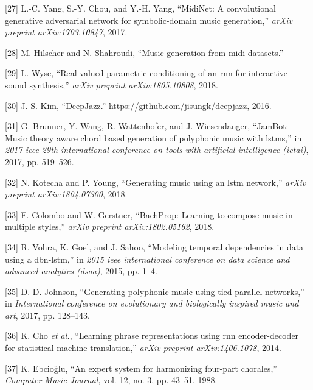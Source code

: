 \documentclass[12pt,]{article}
\begin{document}
\leavevmode\hypertarget{ref-yang2017midinet}{}%
{[}27{]} L.-C. Yang, S.-Y. Chou, and Y.-H. Yang, ``MidiNet: A
convolutional generative adversarial network for symbolic-domain music
generation,'' \emph{arXiv preprint arXiv:1703.10847}, 2017.

\leavevmode\hypertarget{ref-hilschermusic}{}%
{[}28{]} M. Hilscher and N. Shahroudi, ``Music generation from midi
datasets.''

\leavevmode\hypertarget{ref-wyse2018real}{}%
{[}29{]} L. Wyse, ``Real-valued parametric conditioning of an rnn for
interactive sound synthesis,'' \emph{arXiv preprint arXiv:1805.10808},
2018.

\leavevmode\hypertarget{ref-kim2016deepjazz}{}%
{[}30{]} J.-S. Kim, ``DeepJazz.''
\url{https://github.com/jisungk/deepjazz}, 2016.

\leavevmode\hypertarget{ref-brunner2017jambot}{}%
{[}31{]} G. Brunner, Y. Wang, R. Wattenhofer, and J. Wiesendanger,
``JamBot: Music theory aware chord based generation of polyphonic music
with lstms,'' in \emph{2017 ieee 29th international conference on tools
with artificial intelligence (ictai)}, 2017, pp. 519--526.

\leavevmode\hypertarget{ref-kotecha2018generating}{}%
{[}32{]} N. Kotecha and P. Young, ``Generating music using an lstm
network,'' \emph{arXiv preprint arXiv:1804.07300}, 2018.

\leavevmode\hypertarget{ref-colombo2018bachprop}{}%
{[}33{]} F. Colombo and W. Gerstner, ``BachProp: Learning to compose
music in multiple styles,'' \emph{arXiv preprint arXiv:1802.05162},
2018.

\leavevmode\hypertarget{ref-vohra2015modeling}{}%
{[}34{]} R. Vohra, K. Goel, and J. Sahoo, ``Modeling temporal
dependencies in data using a dbn-lstm,'' in \emph{2015 ieee
international conference on data science and advanced analytics (dsaa)},
2015, pp. 1--4.

\leavevmode\hypertarget{ref-johnson2017generating}{}%
{[}35{]} D. D. Johnson, ``Generating polyphonic music using tied
parallel networks,'' in \emph{International conference on evolutionary
and biologically inspired music and art}, 2017, pp. 128--143.

\leavevmode\hypertarget{ref-cho2014learning}{}%
{[}36{]} K. Cho \emph{et al.}, ``Learning phrase representations using
rnn encoder-decoder for statistical machine translation,'' \emph{arXiv
preprint arXiv:1406.1078}, 2014.

\leavevmode\hypertarget{ref-ebciouglu1988expert}{}%
{[}37{]} K. Ebcioğlu, ``An expert system for harmonizing four-part
chorales,'' \emph{Computer Music Journal}, vol. 12, no. 3, pp. 43--51,
1988.
\end{document}
